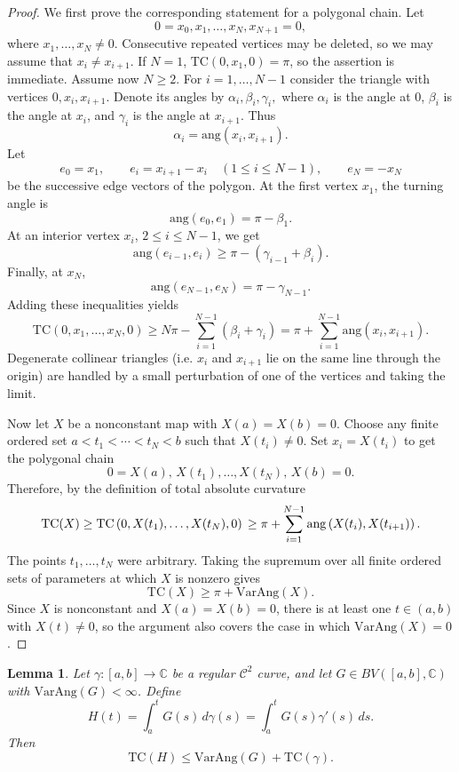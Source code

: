 \documentclass[reqno]{amsart}
\newtheorem{lemma}[theorem]{Lemma}
\theoremstyle{definition}
\newcommand{\ang}{\mathrm{ang}}
\newcommand{\T}{\mathrm{TC}}
\newcommand{\VA}{\mathrm{VarAng}}
\newcommand{\cC}{\mathcal{C}}
\numberwithin{equation}{section}
\begin{document}
\begin{proof}
We first prove the corresponding statement for a polygonal chain. Let
\[0=x_0,x_1,\ldots,x_N,x_{N+1}=0,\]
where $x_1,\ldots,x_N\neq0$.  Consecutive repeated vertices may be deleted, so we may assume that $x_i\neq x_{i+1}$. If $N=1$, $\T(0,x_1,0)=\pi$, so the assertion is immediate. Assume now $N\ge 2$. For $i=1,\ldots,N-1$ consider the triangle with vertices $0,x_i,x_{i+1}$.  Denote its angles by $\alpha_i,\beta_i,\gamma_i,$ where $\alpha_i$ is the angle at $0$, $\beta_i$ is the angle at $x_i$, and $\gamma_i$ is the angle at $x_{i+1}$.  Thus
\[\alpha_i=\ang(x_i,x_{i+1}).\]
Let
\[e_0=x_1,\qquad e_i=x_{i+1}-x_i\quad(1\le i\le N-1),\qquad e_N=-x_N
\]
be the successive edge vectors of the polygon. At the first vertex $x_1$, the turning angle is
\[
    \ang(e_0,e_1)=\pi-\beta_1.
\]
At an interior vertex $x_i$, $2\le i\le N-1$, we get
\[\ang(e_{i-1},e_i)\ge \pi-(\gamma_{i-1}+\beta_i).
\]
Finally, at $x_N$,
\[\ang(e_{N-1},e_N)=\pi-\gamma_{N-1}.\]
Adding these inequalities yields
\[\T (0,x_1,\ldots,x_N,0)\ge
    N\pi-\sum_{i=1}^{N-1}(\beta_i+\gamma_i)=\pi+
    \sum_{i=1}^{N-1}
    \ang(x_i,x_{i+1}).
    \]
Degenerate collinear triangles (i.e. $x_i$ and $x_{i+1}$ lie on the same line through the origin) are handled by a small perturbation of one of the vertices and taking the limit.

Now let $X$ be a nonconstant map with $X(a)=X(b)=0$. Choose any finite ordered set $a<t_1<\cdots<t_N<b $ such that $X(t_i)\neq 0$. Set $x_i=X(t_i)$ to get the polygonal chain
\[
    0=X(a),\,X(t_1),\ldots,X(t_N),\,X(b)=0.
\]
Therefore, by the definition of total absolute curvature 
\[
    \T(X) \ge \T \left(0,X(t_1),\ldots,X(t_N),0\right)\\
    \ge \pi+\sum_{i=1}^{N-1} \ang\left(X(t_i),X(t_{i+1})\right).
\]
The points $t_1,\ldots,t_N$ were arbitrary.  Taking the supremum
over all finite ordered sets of parameters at which $X$ is nonzero
gives
\[\T(X)\ge \pi+\VA(X).\]
Since $X$ is nonconstant and $X(a)=X(b)=0$, there is at least one
$t\in(a,b)$ with $X(t)\neq0$, so the argument also covers the case
in which $\VA(X)=0$.
\end{proof}

\begin{lemma}\label{L2}
Let $\gamma:[a,b]\to\mathbb C$ be a regular $\cC^2$ curve, and let $G\in BV([a,b],\mathbb C)$ with $\VA(G)<\infty$. Define
\[
H(t)=\int_a^t G(s)\,d\gamma(s)
     =\int_a^t G(s)\gamma'(s)\,ds.
\]
Then
\[\T(H)\le \VA(G)+\T(\gamma).\]
\end{lemma}
\end{document}
